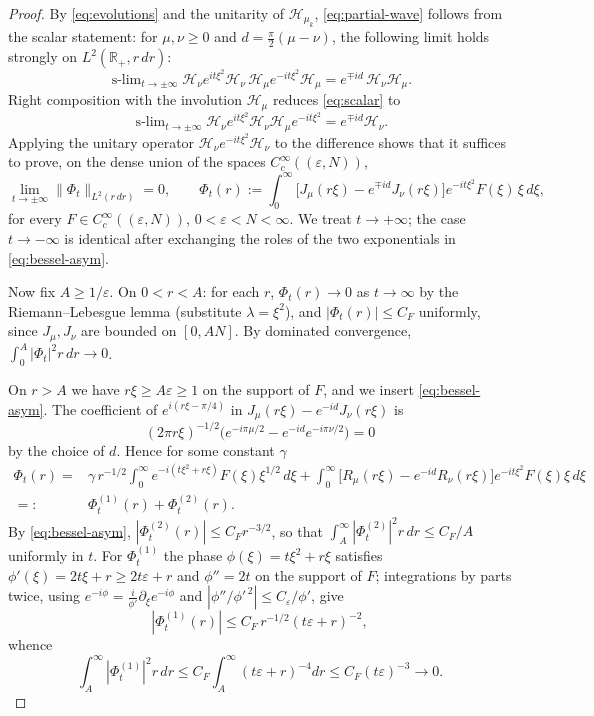 \documentclass[11pt,a4paper,reqno,backref=page]{amsart}
\newcommand{\R}{\mathbb R}
\newcommand{\HH}{\mathcal H}                 %
\newcommand{\dd}{\,d}
\DeclareMathOperator*{\slim}{s\text{-}lim}
\newcommand{\coloneq}{:=}
\numberwithin{equation}{section}
\theoremstyle{definition}
\theoremstyle{remark}
\begin{document}
\begin{proof}
By \eqref{eq:evolutions} and the unitarity of $\HH_{\mu_k}$,
\eqref{eq:partial-wave} follows from the scalar statement: for
$\mu,\nu\ge0$ and $d=\frac\pi2(\mu-\nu)$, the following limit
holds strongly on $L^2(\R_+,r\,dr)$:
\begin{equation}\label{eq:scalar}
  \slim_{t\to\pm\infty}
  \HH_\nu e^{it\xi^2}\HH_\nu\,\HH_\mu e^{-it\xi^2}\HH_\mu
  =e^{\mp id}\,\HH_\nu\HH_\mu.
\end{equation}
Right composition with the involution $\HH_\mu$ reduces
 \eqref{eq:scalar} to
\begin{equation*}
  \slim_{t\to\pm\infty}
  \HH_\nu e^{it\xi^2}\HH_\nu\HH_\mu e^{-it\xi^2}
  =e^{\mp id}\HH_\nu.
\end{equation*}
Applying the unitary operator $\HH_\nu e^{-it\xi^2}\HH_\nu$ to
the difference shows that it suffices to prove, on the dense
union of the spaces $C_c^\infty((\varepsilon,N))$,
\begin{equation}\label{eq:scalar-norm}
  \lim_{t\to\pm\infty}\bigl\|\Phi_t\bigr\|_{L^2(r\,dr)}=0,\qquad
  \Phi_t(r)\coloneq\int_0^\infty\bigl[J_\mu(r\xi)-e^{\mp
  id}J_\nu(r\xi)\bigr]
  e^{-it\xi^2}F(\xi)\,\xi\dd\xi,
\end{equation}
for every $F\in C_c^\infty((\varepsilon,N))$,
$0<\varepsilon<N<\infty$. We treat $t\to+\infty$; the case
$t\to-\infty$ is identical after exchanging the roles of the two
exponentials in \eqref{eq:bessel-asym}. 

Now fix $A\ge1/\varepsilon$. On $0<r<A$: for each $r$, $\Phi_t(r)\to0$ as $t\to\infty$ by the
Riemann--Lebesgue lemma (substitute $\lambda=\xi^2$), and
$|\Phi_t(r)|\le C_F$ uniformly, since $J_\mu,J_\nu$ are bounded
on $[0,AN]$. By dominated convergence,
$\int_0^A|\Phi_t|^2r\,dr\to0$.

On $r>A$ we have $r\xi\ge A\varepsilon\ge1$ on the support of
$F$, and we insert \eqref{eq:bessel-asym}. The coefficient of
$e^{i(r\xi-\pi/4)}$ in $J_\mu(r\xi)-e^{-id}J_\nu(r\xi)$ is
$$(2\pi
r\xi)^{-1/2}\bigl(e^{-i\pi\mu/2}-e^{-id}e^{-i\pi\nu/2}\bigr)=0$$
by the choice of $d$. Hence for some constant $\gamma$
\begin{equation*}
  \begin{split}
    \Phi_t(r)={}&\gamma\,r^{-1/2}\int_0^\infty
    e^{-i(t\xi^2+r\xi)}F(\xi)\xi^{1/2}\dd\xi
    +\int_0^\infty\bigl[R_\mu(r\xi)-e^{-id}R_\nu(r\xi)\bigr]
    e^{-it\xi^2}F(\xi)\xi\dd\xi\\
    =:{}&\Phi^{(1)}_t(r)+\Phi^{(2)}_t(r).
  \end{split}
\end{equation*}
By \eqref{eq:bessel-asym},
$|\Phi^{(2)}_t(r)|\le C_Fr^{-3/2}$, so that
$\int_A^\infty|\Phi^{(2)}_t|^2r\,dr\le C_F/A$ uniformly in $t$.
For $\Phi^{(1)}_t$ the phase $\phi(\xi)=t\xi^2+r\xi$ satisfies
$\phi'(\xi)=2t\xi+r\ge2t\varepsilon+r$ and $\phi''=2t$ on the
support of $F$; integrations by parts twice, using
$e^{-i\phi}=\frac{i}{\phi'}\partial_\xi e^{-i\phi}$ and
$|\phi''/\phi'^{\,2}|\le C_\varepsilon/\phi'$, give
$$|\Phi^{(1)}_t(r)|\le C_{F}\,r^{-1/2}(t\varepsilon+r)^{-2},$$
whence 
$$\int_A^\infty|\Phi^{(1)}_t|^2r\,dr\le
C_F\int_A^\infty(t\varepsilon+r)^{-4}dr \le
C_F(t\varepsilon)^{-3}\to0.$$


\end{proof}
\end{document}
